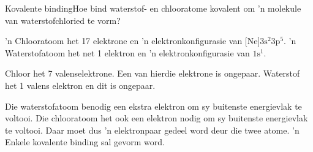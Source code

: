 \begin{wex}{Kovalente binding}{Hoe bind waterstof- en chlooratome  kovalent om  'n molekule van waterstofchloried te vorm?}
{
'n Chlooratoom het 17 elektrone en 'n elektronkonfigurasie van $\text{[Ne]}3\text{s}^{2}3\text{p}^{5}$.  'n Waterstofatoom het net 1 elektron en 'n elektronkonfigurasie van $1\text{s}^{1}$.


Chloor het 7 valenselektrone. Een van hierdie elektrone is ongepaar. Waterstof het 1 valens elektron en dit is ongepaar.

Die waterstofatoom benodig een ekstra elektron om sy buitenste energievlak te voltooi. Die chlooratoom het ook een elektron nodig om sy buitenste energievlak te voltooi. Daar moet dus  'n elektronpaar gedeel word deur die twee atome.  'n Enkele kovalente binding sal gevorm word.
\begin{figure}[H]
\begin{center}
\end{center}
 \end{figure}
}
\end{wex}
